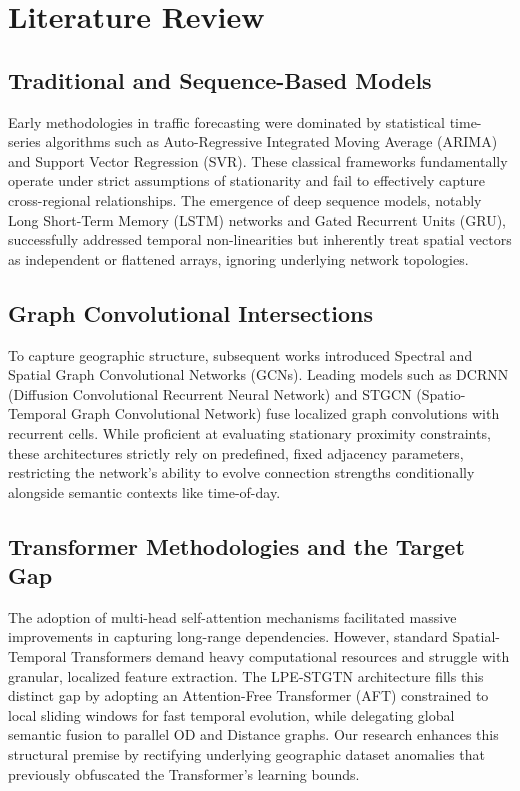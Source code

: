 \documentclass{rapportECL}
\begin{document}
\section{Literature Review}

\subsection{Traditional and Sequence-Based Models}
Early methodologies in traffic forecasting were dominated by statistical time-series algorithms such as Auto-Regressive Integrated Moving Average (ARIMA) and Support Vector Regression (SVR). These classical frameworks fundamentally operate under strict assumptions of stationarity and fail to effectively capture cross-regional relationships. The emergence of deep sequence models, notably Long Short-Term Memory (LSTM) networks and Gated Recurrent Units (GRU), successfully addressed temporal non-linearities but inherently treat spatial vectors as independent or flattened arrays, ignoring underlying network topologies.

\subsection{Graph Convolutional Intersections}
To capture geographic structure, subsequent works introduced Spectral and Spatial Graph Convolutional Networks (GCNs). Leading models such as DCRNN (Diffusion Convolutional Recurrent Neural Network) and STGCN (Spatio-Temporal Graph Convolutional Network) fuse localized graph convolutions with recurrent cells. While proficient at evaluating stationary proximity constraints, these architectures strictly rely on predefined, fixed adjacency parameters, restricting the network's ability to evolve connection strengths conditionally alongside semantic contexts like time-of-day.

\subsection{Transformer Methodologies and the Target Gap}
The adoption of multi-head self-attention mechanisms facilitated massive improvements in capturing long-range dependencies. However, standard Spatial-Temporal Transformers demand heavy computational resources and struggle with granular, localized feature extraction. The LPE-STGTN architecture fills this distinct gap by adopting an Attention-Free Transformer (AFT) constrained to local sliding windows for fast temporal evolution, while delegating global semantic fusion to parallel OD and Distance graphs. Our research enhances this structural premise by rectifying underlying geographic dataset anomalies that previously obfuscated the Transformer's learning bounds.
\end{document}
